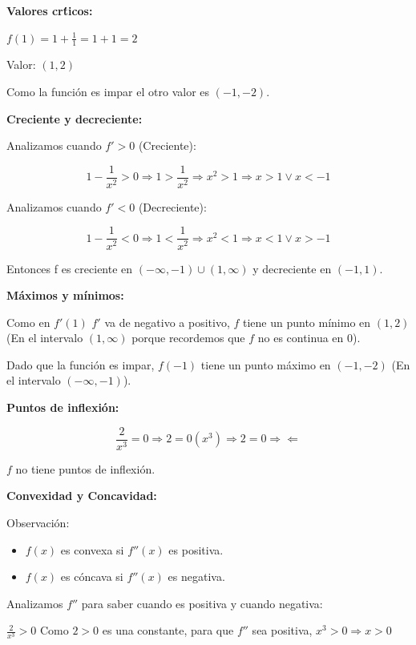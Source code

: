 \documentclass[12pt]{article}
\begin{document}
\begin{enumerate}[\hspace{9px} a)]
        \textbf{Valores cr\'ticos:}

        \(f(1) = 1 + \displaystyle\frac{1}{1} = 1+1 = 2\)\medskip
        
        Valor: $(1,2)$\medskip

        Como la funci\'on es impar el otro valor es $(-1,-2)$.\medskip

        \textbf{Creciente y decreciente:}\medskip

        Analizamos cuando $f'>0$ (Creciente):

        \[1-\displaystyle\frac{1}{x^2}>0 \Rightarrow 1>\frac{1}{x^2} \Rightarrow x^2>1 \Rightarrow x>1 \vee x<-1\]

        Analizamos cuando $f'<0$ (Decreciente):

        \[1-\displaystyle\frac{1}{x^2}<0 \Rightarrow 1<\frac{1}{x^2} \Rightarrow x^2<1 \Rightarrow x<1 \vee x>-1\]

        Entonces f es creciente en $(-\infty,-1)\cup(1,\infty)$ y decreciente en $(-1,1)$.\medskip

        \textbf{M\'aximos y m\'inimos:}\medskip

        Como en $f'(1)$ $f'$ va de negativo a positivo, $f$ tiene un punto m\'inimo en $(1,2)$ (En el intervalo $(1,\infty)$ porque recordemos que $f$ no es continua en 0).

        Dado que la funci\'on es impar, $f(-1)$ tiene un punto m\'aximo en $(-1,-2)$ (En el intervalo $(-\infty,-1)$).\medskip

        \textbf{Puntos de inflexi\'on:}

        \[\displaystyle\frac{2}{x^3} = 0 \Rightarrow 2=0(x^3) \Rightarrow 2=0 \Rightarrow\!\Leftarrow\]

        $f$ no tiene puntos de inflexi\'on.\medskip

        \textbf{Convexidad y Concavidad:}\medskip

        Observaci\'on: 
        \begin{itemize}
            \item $f(x)$ es convexa si $f''(x)$ es positiva.
            \item $f(x)$ es c\'oncava si $f''(x)$ es negativa.
        \end{itemize}

        Analizamos $f''$ para saber cuando es positiva y cuando negativa:\medskip
        
        \(\displaystyle\frac{2}{x^3} > 0\) \quad Como $2>0$ es una constante, para que $f''$ sea positiva, \(x^3>0 \Rightarrow x>0\)\medskip


\end{enumerate}
\end{document}
